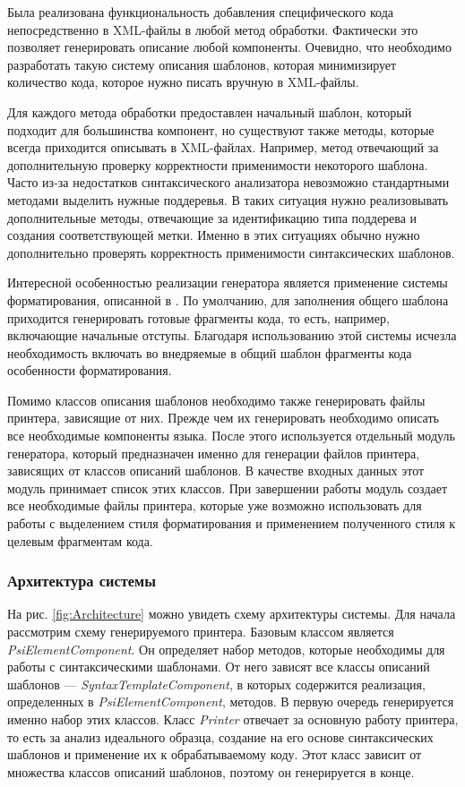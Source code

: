 \documentclass{matmex-diploma}
\begin{document}
Была реализована функциональность добавления специфического кода непосредственно в XML-файлы в любой метод обработки. Фактически это позволяет генерировать описание любой компоненты. Очевидно, что необходимо разработать такую систему описания шаблонов, которая минимизирует количество кода, которое нужно писать вручную в XML-файлы. 

Для каждого метода обработки предоставлен начальный шаблон, который подходит для большинства компонент, но существуют также методы, которые всегда приходится описывать в XML-файлах. Например, метод отвечающий за дополнительную проверку корректности применимости некоторого шаблона. Часто из-за недостатков синтаксического анализатора невозможно стандартными методами выделить нужные поддеревья. В таких ситуация нужно реализовывать дополнительные методы, отвечающие за идентификацию типа поддерева и создания соответствующей метки. Именно в этих ситуациях обычно нужно дополнительно проверять корректность применимости синтаксических шаблонов.

Интересной особенностью реализации генератора является применение системы форматирования, описанной в \cite{podkopaev:diploma}. По умолчанию, для заполнения общего шаблона приходится генерировать готовые фрагменты кода, то есть, например, включающие начальные отступы. Благодаря использованию этой системы исчезла необходимость включать во внедряемые в общий шаблон фрагменты кода особенности форматирования.

Помимо классов описания шаблонов необходимо также генерировать файлы принтера, зависящие от них. Прежде чем их генерировать необходимо описать все необходимые компоненты языка. После этого используется отдельный модуль генератора, который предназначен именно для генерации файлов принтера, зависящих от классов описаний шаблонов. В качестве входных данных этот модуль принимает список этих классов. При завершении работы модуль создает все необходимые файлы принтера, которые уже возможно использовать для работы с выделением стиля форматирования и применением полученного стиля к целевым фрагментам кода.

\subsubsection{Архитектура системы}
На рис. \ref{fig:Architecture} можно увидеть схему архитектуры системы. Для начала рассмотрим схему генерируемого принтера. Базовым классом является \textit{PsiElementComponent}. Он определяет набор методов, которые необходимы для работы с синтаксическими шаблонами. От него зависят все классы описаний шаблонов --- \textit{SyntaxTemplateComponent}, в которых содержится реализация, определенных в \textit{PsiElementComponent}, методов. В первую очередь генерируется именно набор этих классов. Класс \textit{Printer} отвечает за основную работу принтера, то есть за анализ идеального образца, создание на его основе синтаксических шаблонов и применение их к обрабатываемому коду. Этот класс зависит от множества классов описаний шаблонов, поэтому он генерируется в конце.
\end{document}
